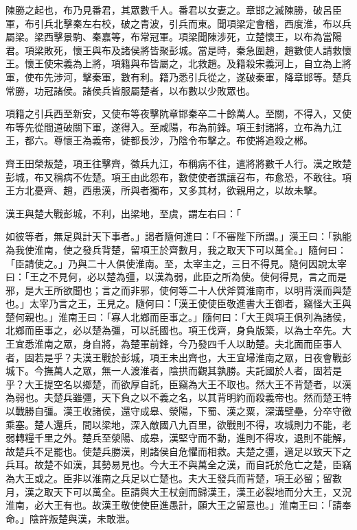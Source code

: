 \begin{pinyinscope}
陳勝之起也，布乃見番君，其眾數千人。番君以女妻之。章邯之滅陳勝，破呂臣軍，布引兵北擊秦左右校，破之青波，引兵而東。聞項梁定會稽，西度淮，布以兵屬梁。梁西擊景駒、秦嘉等，布常冠軍。項梁聞陳涉死，立楚懷王，以布為當陽君。項梁敗死，懷王與布及諸侯將皆聚彭城。當是時，秦急圍趙，趙數使人請救懷王。懷王使宋義為上將，項籍與布皆屬之，北救趙。及籍殺宋義河上，自立為上將軍，使布先涉河，擊秦軍，數有利。籍乃悉引兵從之，遂破秦軍，降章邯等。楚兵常勝，功冠諸侯。諸侯兵皆服屬楚者，以布數以少敗眾也。

項籍之引兵西至新安，又使布等夜擊阬章邯秦卒二十餘萬人。至關，不得入，又使布等先從間道破關下軍，遂得入。至咸陽，布為前鋒。項王封諸將，立布為九江王，都六。尊懷王為義帝，徙都長沙，乃陰令布擊之。布使將追殺之郴。

齊王田榮叛楚，項王往擊齊，徵兵九江，布稱病不往，遣將將數千人行。漢之敗楚彭城，布又稱病不佐楚。項王由此怨布，數使使者譙讓召布，布愈恐，不敢往。項王方北憂齊、趙，西患漢，所與者獨布，又多其材，欲親用之，以故未擊。

漢王與楚大戰彭城，不利，出梁地，至虞，謂左右曰：「

如彼等者，無足與計天下事者。」謁者隨何進曰：「不審陛下所謂。」漢王曰：「孰能為我使淮南，使之發兵背楚，留項王於齊數月，我之取天下可以萬全。」隨何曰：「臣請使之。」乃與二十人俱使淮南。至，太宰主之，三日不得見。隨何因說太宰曰：「王之不見何，必以楚為彊，以漢為弱，此臣之所為使。使何得見，言之而是邪，是大王所欲聞也；言之而非邪，使何等二十人伏斧質淮南巿，以明背漢而與楚也。」太宰乃言之王，王見之。隨何曰：「漢王使使臣敬進書大王御者，竊怪大王與楚何親也。」淮南王曰：「寡人北鄉而臣事之。」隨何曰：「大王與項王俱列為諸侯，北鄉而臣事之，必以楚為彊，可以託國也。項王伐齊，身負版築，以為士卒先。大王宜悉淮南之眾，身自將，為楚軍前鋒，今乃發四千人以助楚。夫北面而臣事人者，固若是乎？夫漢王戰於彭城，項王未出齊也，大王宜埽淮南之眾，日夜會戰彭城下。今撫萬人之眾，無一人渡淮者，陰拱而觀其孰勝。夫託國於人者，固若是乎？大王提空名以鄉楚，而欲厚自託，臣竊為大王不取也。然大王不背楚者，以漢為弱也。夫楚兵雖彊，天下負之以不義之名，以其背明約而殺義帝也。然而楚王特以戰勝自彊。漢王收諸侯，還守成皋、滎陽，下蜀、漢之粟，深溝壁壘，分卒守徼乘塞。楚人還兵，間以梁地，深入敵國八九百里，欲戰則不得，攻城則力不能，老弱轉糧千里之外。楚兵至滎陽、成皋，漢堅守而不動，進則不得攻，退則不能解，故楚兵不足罷也。使楚兵勝漢，則諸侯自危懼而相救。夫楚之彊，適足以致天下之兵耳。故楚不如漢，其勢易見也。今大王不與萬全之漢，而自託於危亡之楚，臣竊為大王或之。臣非以淮南之兵足以亡楚也。夫大王發兵而背楚，項王必留；留數月，漢之取天下可以萬全。臣請與大王杖劍而歸漢王，漢王必裂地而分大王，又況淮南，必大王有也。故漢王敬使使臣進愚計，願大王之留意也。」淮南王曰：「請奉命。」陰許叛楚與漢，未敢泄。


\end{pinyinscope}
